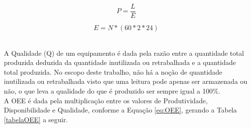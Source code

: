 \begin{equation}
  P = \frac{L}{E}
  \label{eq:prod}
\end{equation}

\begin{equation}
  E = N * (60 * 2 * 24)
  \label{eq:esp}
\end{equation}

\begin{center}
\label{produtividade}
\end{center}

\\\null \quad A Qualidade (Q) de um equipamento é dada pela razão entre a quantidade total produzida deduzida da quantidade inutilizada ou retrabalhada e a quantidade total produzida. No escopo deste trabalho, não há a noção de quantidade inutilizada ou retrabalhada visto que uma leitura pode apenas ser armazenada ou não, o que leva a qualidade do que é produzido ser sempre igual a 100\%.
\\\null \quad A \acrshort{OEE} é dada pela multiplicação entre os valores de Produtividade, Disponibilidade e Qualidade, conforme a Equação \ref{eq:OEE}, gerando a Tabela \ref{tabelaOEE} a seguir.

